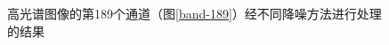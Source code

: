 \documentclass[12pt, a4paper]{article}
\begin{document}
\begin{figure}[htbp]
\caption{高光谱图像的第189个通道（图\ref{band-189}）经不同降噪方法进行处理的结果}
\label{bands-189}
\end{figure}
\end{document}
